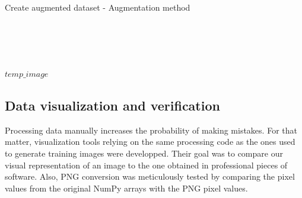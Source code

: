 \begin{algorithm}
    \caption{Create augmented dataset - Augmentation method}
    \label{alg:augment}
    \begin{algorithmic}[1] %
        		 \\
        		 
        		 \\
        		\\
        		\EndIf\\
        		\Return $temp\_image$
        \EndProcedure
    \end{algorithmic}
\end{algorithm}


\subsection{Data visualization and verification}

Processing data manually increases the probability of making mistakes. For that matter, visualization tools relying on the same processing code as the ones used to generate training images were developped. Their goal was to compare our visual representation of an image to the one obtained in professional pieces of software. Also, PNG conversion was meticulously tested by comparing the pixel values from the original NumPy arrays with the PNG pixel values. 


